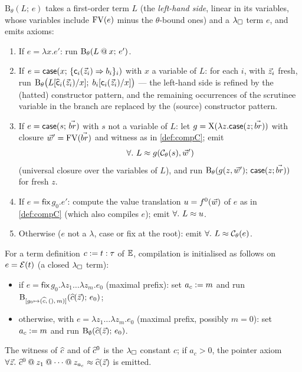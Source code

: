 \begin{definition}
\label{def:compile}
$\mathrm{B}_\theta(L;\, e)$ takes a first-order term $L$ (the
\emph{left-hand side}, linear in its variables, whose variables include
$\mathrm{FV}(e)$ minus the $\theta$-bound ones) and a $\lambda_{\square}$ term $e$, and emits
axioms:
\begin{enumerate}[leftmargin=2em]
\item If $e = \lambda x.e'$: run $\mathrm{B}_\theta(L \mathbin{@} x;\, e')$.
\item If $e = \mathsf{case}(x;\, \{\mathsf{c}_i(\vec{z}_i) \Rightarrow
  b_i\}_i)$ with $x$ a variable of $L$: for each $i$, with $\vec{z}_i$
  fresh, run
  $\mathrm{B}_\theta\bigl(
    L[\widehat{\mathsf{c}}_i(\vec{z}_i)/x];\;
    b_i[\mathsf{c}_i(\vec{z}_i)/x]\bigr)$
  --- the left-hand side is refined by the (hatted) constructor pattern,
  and the remaining occurrences of the scrutinee variable in the branch
  are replaced by the (source) constructor pattern.
\item If $e = \mathsf{case}(s;\, \vec{br})$ with $s$ not a variable of
  $L$: let $g = \mathrm{X}(\lambda z.\mathsf{case}(z;\vec{br}))$ with
  closure $\vec{w}' = \mathrm{FV}(\vec{br})$ and witness as in
  \cref{def:compC}; emit
  \[
    \forall.\ L \approx g(\mathcal{C}_\theta(s), \vec{w}')
  \]
  (universal closure over the variables of $L$), and run
  $\mathrm{B}_\theta(g(z, \vec{w}');\, \mathsf{case}(z; \vec{br}))$ for
  fresh $z$.
\item If $e = \mathsf{fix}\,g_0.e'$: compute the value translation $u =
  f^0(\vec{w})$ of $e$ as in \cref{def:compC} (which also compiles $e$);
  emit $\forall.\ L \approx u$.
\item Otherwise ($e$ not a $\lambda$, case or fix at the root): emit
  $\forall.\ L \approx \mathcal{C}_\theta(e)$.
\end{enumerate}
For a term definition $c \mathrel{:=} t : \tau$ of $\mathbb{E}$, compilation is
initialised as follows on $e = \mathcal{E}(t)$ (a closed $\lambda_{\square}$ term):
\begin{itemize}[leftmargin=2em]
\item if $e = \mathsf{fix}\,g_0.\lambda z_1 \dots \lambda z_m.e_0$
  (maximal prefix): set $a_c \mathrel{:=} m$ and run
  $\mathrm{B}_{[g_0 \mapsto (\widehat{c},\, (),\, m)]}(\widehat{c}(\vec{z});\,
  e_0)$;
\item otherwise, with $e = \lambda z_1 \dots \lambda z_m.e_0$ (maximal
  prefix, possibly $m = 0$): set $a_c \mathrel{:=} m$ and run
  $\mathrm{B}_{\emptyset}(\widehat{c}(\vec{z});\, e_0)$.
\end{itemize}
The witness of $\widehat{c}$ and of $\widehat{c}^0$ is the $\lambda_{\square}$ constant $c$;
if $a_c > 0$, the pointer axiom
$\forall \tup{z}.\ \Ihat{c}^0 \fapp z_1 \fapp \cdots \fapp z_{a_c} \feq
\Ihat{c}(\tup{z})$ is emitted.
\end{definition}

